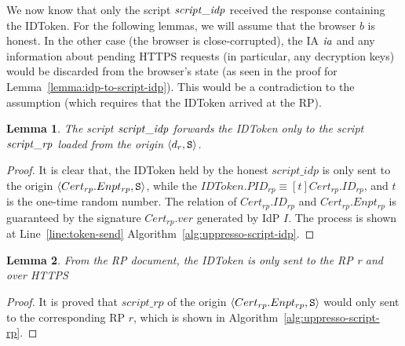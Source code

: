 \documentclass[letterpaper,onecolumn,10pt]{article}
\newtheorem{lemma}{Lemma}
\begin{document}
We now know that only the script $\mathit{script\_idp}$ received the
response containing the IDToken. For the following lemmas, we will assume
that the browser $b$ is honest. In the other case (the browser is
close-corrupted), the IA $\mathit{ia}$ and any information about pending
HTTPS requests (in particular, any decryption keys) would be discarded
from the browser's state (as seen in the proof for 
Lemma~\ref{lemma:idp-to-script-idp}). This would be a contradiction to
the assumption (which requires that the IDToken arrived at the RP).


\begin{lemma} %
  The script $\mathit{script\_idp}$ forwards the IDToken only to the script 
  $\mathit{script\_rp}$ loaded from the origin $\langle d_r, \mathtt{S}\rangle$.
\end{lemma}
\begin{proof}
  It is clear that, the IDToken held by the honest $script\_idp$ is only 
  sent to the origin $\langle Cert_{rp}.Enpt_{rp}, \mathtt{S}\rangle$, 
  while the $IDToken.PID_{rp} \equiv [t]Cert_{rp}.ID_{rp}$, and $t$ is the 
  one-time random number. The relation of $Cert_{rp}.ID_{rp}$ and 
  $Cert_{rp}.Enpt_{rp}$ is guaranteed by the signature $Cert_{rp}.ver$ generated 
  by IdP $I$. The process is shown at Line~\ref{line:token-send}
  Algorithm~\ref{alg:uppresso-script-idp}.
\end{proof}

\begin{lemma} %
  From the RP document, the IDToken is only sent to the RP r and over HTTPS
\end{lemma}
\begin{proof}
It is proved that $script\_rp$ of the origin $\langle Cert_{rp}.Enpt_{rp}, \mathtt{S}\rangle$ 
would only sent to the corresponding RP $r$, which is shown in Algorithm~\ref{alg:uppresso-script-rp}.
\end{proof}
\end{document}
